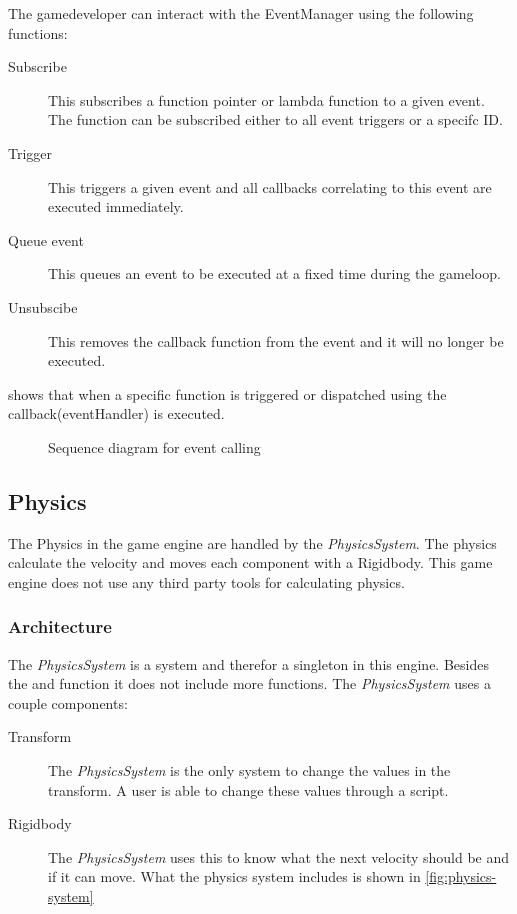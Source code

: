\documentclass{projdoc}
\begin{document}
The gamedeveloper can interact with the EventManager using the following
functions:\noparbreak
\begin{description}
	\item[Subscribe] This subscribes a function pointer or lambda function to a given
		event. The function can be subscribed either to all event triggers or a specifc
		ID.
	\item[Trigger] This triggers a given event and all callbacks correlating to this
		event are executed immediately.
	\item[Queue event] This queues an event to be executed at a fixed time during the
		gameloop.
	\item[Unsubscibe] This removes the callback function from the event and it will no
		longer be executed.
\end{description}

 shows that when a specific function is triggered or dispatched
using the callback(eventHandler) is executed.

\begin{figure}
	\centering
	\caption{Sequence diagram for event calling}
	\label{fig:event-seq}
\end{figure}

\subsection{Physics}

The Physics in the game engine are handled by the \emph{PhysicsSystem}. The physics
calculate the velocity and moves each component with a Rigidbody. This game engine
does not use any third party tools for calculating physics.

\subsubsection{Architecture}

The \emph{PhysicsSystem} is a system and therefor a singleton in this engine. Besides
the  and  function it does not include
more functions. The \emph{PhysicsSystem} uses a couple components:\noparbreak
\begin {description}
	\item[Transform] The \emph{PhysicsSystem} is the only system to change the values
		in the transform. A user is able to change these values through a script.
	\item[Rigidbody] The \emph{PhysicsSystem} uses this to know what the next velocity
		should be and if it can move. What the physics system includes is shown in
		\cref{fig:physics-system}
\end{description}
\end{document}
